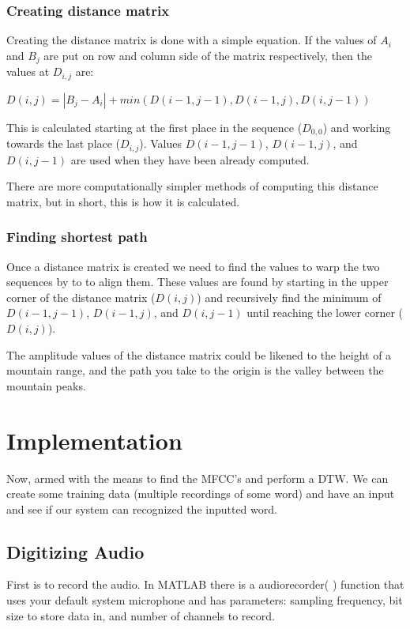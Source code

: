 \documentclass{article}
\begin{document}
\subsubsection{Creating distance matrix}
Creating the distance matrix is done with a simple equation. If the values of $A_i$ and $B_j$ are put on row and column side of the matrix respectively, then the values at $D_{i,j}$ are:
\begin{center}
    $D(i,j) = |B_j - A_i| + min(D(i-1,j-1),D(i-1,j),D(i,j-1))$
\end{center}
\noindent
This is calculated starting at the first place in the sequence ($D_{0,0}$) and working towards the last place ($D_{i,j}$). Values $D(i-1,j-1)$, $D(i-1,j)$, and $D(i,j-1)$ are used when they have been already computed.

There are more computationally simpler methods of computing this distance matrix, but in short, this is how it is calculated.

\subsubsection{Finding shortest path}
Once a distance matrix is created we need to find the values to warp the two sequences by to to align them. These values are found by starting in the upper corner of the distance matrix ($D(i,j)$) and recursively find the minimum of $D(i-1,j-1)$, $D(i-1,j)$, and $D(i,j-1)$ until reaching the lower corner ($D(i,j)$). 

The amplitude values of the distance matrix could be likened to the height of a mountain range, and the path you take to the origin is the valley between the mountain peaks.

\section{Implementation}
Now, armed with the means to find the MFCC's and perform a DTW. We can create some training data (multiple recordings of some word) and have an input and see if our system can recognized the inputted word.

\subsection{Digitizing Audio}
First is to record the audio. In MATLAB there is a audiorecorder( ) function that uses your default system microphone and has parameters: sampling frequency, bit size to store data in, and number of channels to record.
\end{document}
